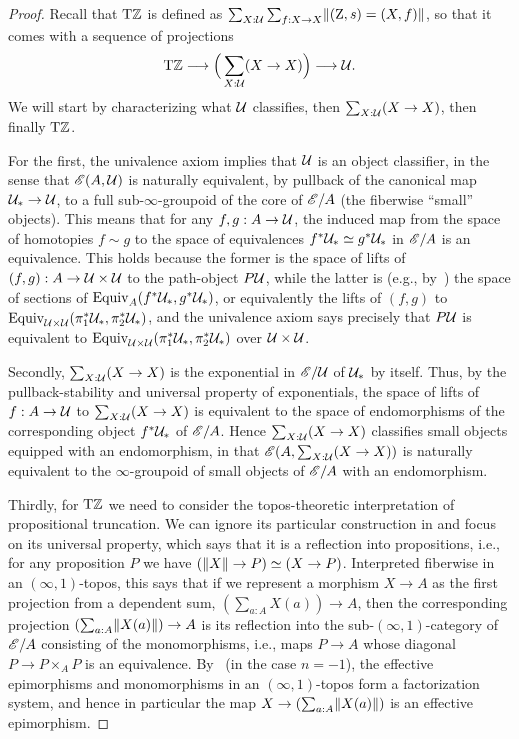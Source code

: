\documentclass[a4paper,12pt]{amsart}
\begin{document}
\begin{proof}
  Recall that ${\mathrm{T}\mathbb{Z}}$ is defined as $\sum_{X:\mathcal{U}}\sum_{f:X\to X} \lVert(\mathrm{Z},s)=(X,f)\rVert$, so that it comes with a sequence of projections
  \[ {\mathrm{T}\mathbb{Z}} \longrightarrow \Big(\sum_{X:\mathcal{U}} (X\to X)\Big) \longrightarrow \mathcal{U} .\]
  We will start by characterizing what $\mathcal{U}$ classifies, then $\sum_{X:\mathcal{U}} (X\to X)$, then finally ${\mathrm{T}\mathbb{Z}}$.

For the first, the univalence axiom implies that $\mathcal{U}$ is an object classifier, in the sense that $\mathscr{E}(A,\mathcal{U})$ is naturally equivalent, by pullback of the canonical map $\mathcal{U}_*\to \mathcal{U}$, to a full sub-$\infty$-groupoid of the core of $\mathscr{E}/A$ (the fiberwise ``small'' objects).
This means that for any $f,g:A\to \mathcal{U}$, the induced map from the space of homotopies $f\sim g$ to the space of equivalences $f^*\mathcal{U}_* \simeq g^*\mathcal{U}_*$ in $\mathscr{E}/A$ is an equivalence.
This holds because the former is the space of lifts of $(f,g):A\to \mathcal{U}\times \mathcal{U}$ to the path-object $P\mathcal{U}$, while the latter is (e.g., by~\cite[Lemma 4.3]{shulman:elreedy}) the space of sections of $\mathrm{Equiv}_A(f^*\mathcal{U}_*,g^*\mathcal{U}_*)$, or equivalently the lifts of $(f,g)$ to $\mathrm{Equiv}_{\mathcal{U}\times \mathcal{U}}(\pi_1^*\mathcal{U}_*,\pi_2^*\mathcal{U}_*)$, and the univalence axiom says precisely that $P\mathcal{U}$ is equivalent to $\mathrm{Equiv}_{\mathcal{U}\times \mathcal{U}}(\pi_1^*\mathcal{U}_*,\pi_2^*\mathcal{U}_*)$ over $\mathcal{U}\times\mathcal{U}$.

Secondly, $\sum_{X:\mathcal{U}} (X\to X)$ is the exponential in $\mathscr{E}/\mathcal{U}$ of $\mathcal{U}_*$ by itself.
Thus, by the pullback-stability and universal property of exponentials, the space of lifts of $f:A\to \mathcal{U}$ to $\sum_{X:\mathcal{U}} (X\to X)$ is equivalent to the space of endomorphisms of the corresponding object $f^*\mathcal{U}_*$ of $\mathscr{E}/A$.
Hence $\sum_{X:\mathcal{U}} (X\to X)$ classifies small objects equipped with an endomorphism, in that $\mathscr{E}(A, \sum_{X:\mathcal{U}} (X\to X))$ is naturally equivalent to the $\infty$-groupoid of small objects of $\mathscr{E}/A$ with an endomorphism.

Thirdly, for ${\mathrm{T}\mathbb{Z}}$ we need to consider the topos-theoretic interpretation of propositional truncation.
We can ignore its particular construction in {\UniMath} and focus on its universal property, which says that it is a reflection into propositions, i.e., for any proposition $P$ we have $(\lVert X\rVert\to P) \simeq (X\to P)$.
Interpreted fiberwise in an $(\infty,1)$-topos, this says that if we represent a morphism $X\to A$ as the first projection from a dependent sum, $(\sum_{a:A} X(a)) \to A$, then the corresponding projection $(\sum_{a:A} \lVert X(a)\rVert)\to A$ is its reflection into the sub-$(\infty,1)$-category of $\mathscr{E}/A$ consisting of the monomorphisms, i.e., maps $P\to A$ whose diagonal $P\to P\times_A P$ is an equivalence.
By~\cite[Example 5.2.8.16 and Corollary 6.5.1.14]{lurie:higher-topoi} (in the case $n=-1$), the effective epimorphisms and monomorphisms in an $(\infty,1)$-topos form a factorization system, and hence in particular the map $X\to (\sum_{a:A} \lVert X(a)\rVert)$ is an effective epimorphism.


\end{proof}
\end{document}
